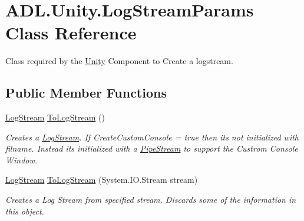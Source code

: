 \hypertarget{class_a_d_l_1_1_unity_1_1_log_stream_params}{}\section{A\+D\+L.\+Unity.\+Log\+Stream\+Params Class Reference}
\label{class_a_d_l_1_1_unity_1_1_log_stream_params}


Class required by the \mbox{\hyperlink{namespace_a_d_l_1_1_unity}{Unity}} Component to Create a logstream.  


\subsection*{Public Member Functions}
\begin{DoxyCompactItemize}
\item 
\mbox{\hyperlink{class_a_d_l_1_1_log_stream}{Log\+Stream}} \mbox{\hyperlink{class_a_d_l_1_1_unity_1_1_log_stream_params_a511976146d776a6e618baf1e47c99f34}{To\+Log\+Stream}} ()
\begin{DoxyCompactList}\small\item\em Creates a \mbox{\hyperlink{class_a_d_l_1_1_log_stream}{Log\+Stream}}. If Create\+Custom\+Console = true then its not initialized with filname. Instead its initialized with a \mbox{\hyperlink{class_a_d_l_1_1_pipe_stream}{Pipe\+Stream}} to support the Custrom Console Window. \end{DoxyCompactList}\item 
\mbox{\hyperlink{class_a_d_l_1_1_log_stream}{Log\+Stream}} \mbox{\hyperlink{class_a_d_l_1_1_unity_1_1_log_stream_params_a8cd3548465c20596918ee37292bed704}{To\+Log\+Stream}} (System.\+I\+O.\+Stream stream)
\begin{DoxyCompactList}\small\item\em Creates a Log Stream from specified stream. Discards some of the information in this object. \end{DoxyCompactList}\end{DoxyCompactItemize}
